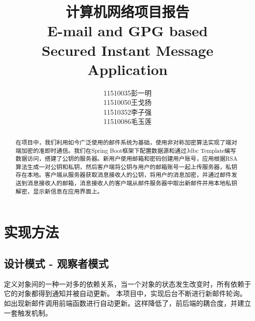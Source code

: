 \documentclass[a4paper,UTF8]{article}
\title{ 计算机网络项目报告\\[0.5em]E-mail and GPG based \\ Secured Instant Message Application}
\author{11510035\quad 彭一明\\11510050\quad 王戈扬 \\ 11510352\quad 李子强\\11510086\quad 毛玉莲}
\begin{document}
\maketitle

\begin{abstract}
在项目中，我们利用如今广泛使用的邮件系统为基础，使用非对称加密算法实现了端对端加密的准即时通信。我们在Spring Boot框架下配置数据源和通过Jdbc Template编写数据访问，搭建了公钥的服务器。新用户使用邮箱和密码创建用户账号，应用根据RSA算法生成一对公钥和私钥，然后客户端将公钥与用户的邮箱账号一起上传服务器，私钥存在本地。客户端从服务器获取消息接收人的公钥，将用户的消息加密，并通过邮件发送到消息接收人的邮箱，消息接收人的客户端从邮件服务器中取出新邮件并用本地私钥解密，显示新信息在应用界面上。
\end{abstract}
\section{实现方法}
\subsection{设计模式 - 观察者模式}
	定义对象间的一种一对多的依赖关系，当一个对象的状态发生改变时，所有依赖于它的对象都得到通知并被自动更新。
	本项目中，实现后台不断进行新邮件轮询。如出现新邮件调用前端函数进行自动更新。这样降低了，前后端的耦合度，并建立一套触发机制。
\end{document}
